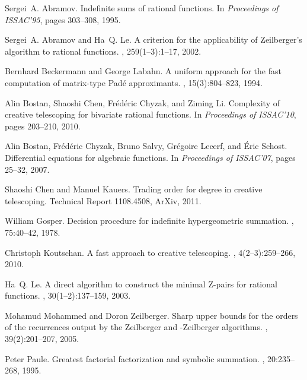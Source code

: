 \documentclass{sig-alternate}
\begin{document}
\begin{thebibliography}{10}

Sergei~A. Abramov.
\newblock Indefinite sums of rational functions.
\newblock In {\em Proceedings of ISSAC'95}, pages 303--308, 1995.

Sergei~A. Abramov and Ha~Q. Le.
\newblock A criterion for the applicability of {Z}eilberger's algorithm to
  rational functions.
, 259(1--3):1--17, 2002.

Bernhard Beckermann and George Labahn.
\newblock A uniform approach for the fast computation of matrix-type {P}ad{\'e}
  approximants.
,
  15(3):804--823, 1994.

Alin Bostan, Shaoshi Chen, Fr\'{e}d\'{e}ric Chyzak, and Ziming Li.
\newblock Complexity of creative telescoping for bivariate rational functions.
\newblock In {\em Proceedings of ISSAC'10}, pages 203--210, 2010.

Alin Bostan, Fr{\'e}d{\'e}ric Chyzak, Bruno Salvy, Gr{\'e}goire Lecerf, and
  {\'E}ric Schost.
\newblock Differential equations for algebraic functions.
\newblock In {\em Proceedings of ISSAC'07}, pages 25--32, 2007.

Shaoshi Chen and Manuel Kauers.
\newblock Trading order for degree in creative telescoping.
\newblock Technical Report 1108.4508, ArXiv, 2011.

William Gosper.
\newblock Decision procedure for indefinite hypergeometric summation.
, 75:40--42, 1978.

Christoph Koutschan.
\newblock A fast approach to creative telescoping.
, 4(2--3):259--266, 2010.

Ha~Q. Le.
\newblock A direct algorithm to construct the minimal {Z}-pairs for rational
  functions.
, 30(1--2):137--159, 2003.

Mohamud Mohammed and Doron Zeilberger.
\newblock Sharp upper bounds for the orders of the recurrences output by the
  {Z}eilberger and -{Z}eilberger algorithms.
, 39(2):201--207, 2005.

Peter Paule.
\newblock Greatest factorial factorization and symbolic summation.
, 20:235--268, 1995.


\end{thebibliography}
\end{document}
